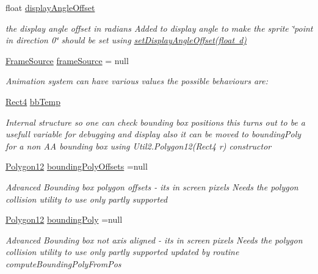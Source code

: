 \begin{DoxyCompactItemize}
float \mbox{\hyperlink{class_r_c___framework_1_1_sprite3_aafcde3bd32143744faf410c304a07f2d}{display\+Angle\+Offset}}
\begin{DoxyCompactList}\small\item\em the display angle offset in radians Added to display angle to make the sprite \char`\"{}point in direction 0\char`\"{} should be set using \mbox{\hyperlink{class_r_c___framework_1_1_sprite3_a2ec8cfce2feb2f1e648131e03099b147}{set\+Display\+Angle\+Offset(float d)}} \end{DoxyCompactList}\item 
\mbox{\hyperlink{class_r_c___framework_1_1_frame_source}{Frame\+Source}} \mbox{\hyperlink{class_r_c___framework_1_1_sprite3_a052b6b4879f526456238accb371373a0}{frame\+Source}} = null
\begin{DoxyCompactList}\small\item\em Animation system can have various values the possible behaviours are\+: \end{DoxyCompactList}\item 
\mbox{\hyperlink{class_r_c___framework_1_1_rect4}{Rect4}} \mbox{\hyperlink{class_r_c___framework_1_1_sprite3_a4fedf0e3c61d7960064f3588a9cc8a93}{bb\+Temp}}
\begin{DoxyCompactList}\small\item\em Internal structure so one can check bounding box positions this turns out to be a usefull variable for debugging and display also it can be moved to bounding\+Poly for a non AA bounding box using Util2.\+Polygon12(\+Rect4 r) constructor \end{DoxyCompactList}\item 
\mbox{\hyperlink{class_r_c___framework_1_1_polygon12}{Polygon12}} \mbox{\hyperlink{class_r_c___framework_1_1_sprite3_a38eaba03c71e388c288d36fbdf9cf9b6}{bounding\+Poly\+Offsets}} =null
\begin{DoxyCompactList}\small\item\em Advanced Bounding box polygon offsets -\/ its in screen pixels Needs the polygon collision utility to use only partly supported \end{DoxyCompactList}\item 
\mbox{\hyperlink{class_r_c___framework_1_1_polygon12}{Polygon12}} \mbox{\hyperlink{class_r_c___framework_1_1_sprite3_a539da11d835c64da3a78039cd05942e9}{bounding\+Poly}} =null
\begin{DoxyCompactList}\small\item\em Advanced Bounding box not axis aligned -\/ its in screen pixels Needs the polygon collision utility to use only partly supported updated by routine compute\+Bounding\+Poly\+From\+Pos \end{DoxyCompactList}\item 

\end{DoxyCompactItemize}
